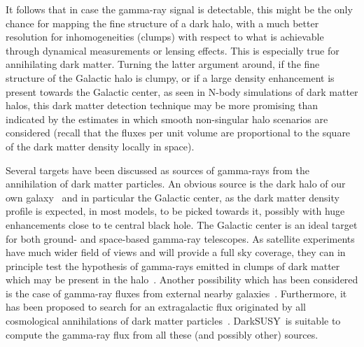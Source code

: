 \documentclass[a4paper,10pt,oneside]{book}
\newcommand{\ds}{{\sffamily DarkSUSY}}
\begin{document}
It follows that in case the gamma-ray signal is detectable, 
this might be the only chance for mapping the fine structure of a dark 
halo, with a much better resolution for inhomogeneities (clumps) with 
respect to what is achievable through dynamical measurements or lensing effects. 
This is especially true for annihilating dark matter. 
Turning the latter argument around, if the fine structure of the Galactic 
halo is clumpy, or if a large density enhancement is present towards the 
Galactic center, as seen in N-body simulations of dark matter halos,
this dark matter detection technique may be more promising than indicated 
by the estimates in which smooth non-singular halo 
scenarios are considered (recall that the fluxes per unit volume are 
proportional to the square of the dark matter density locally in space).


Several targets have been discussed as sources of gamma-rays from the
annihilation of dark matter particles. An obvious source is the dark
halo of our own galaxy~\cite{Turner:1986vr,Ipser:1987ru,Freese:1989tg,Berezinsky:1994wva} and in particular the Galactic center,
as the dark matter density profile is expected, in most models, to be 
picked towards it, possibly with huge enhancements close to te central 
black hole. The Galactic center is an ideal target for both ground-
and space-based gamma-ray telescopes. As satellite experiments have 
much wider field of views and will provide a full sky coverage,
they can in principle test the hypothesis of gamma-rays emitted in clumps of dark 
matter which may be present in the 
halo~\cite{Lake:1990du,Silk:1992bh,CalcaneoRoldan:2000yt,Bergstrom:1998zs,Bergstrom:1998jj,Bergstrom:2000bk}. 
Another possibility which has been considered is the case of 
gamma-ray fluxes from external nearby galaxies~\cite{Baltz:1999ra}. 
Furthermore, it has 
been proposed to search for an extragalactic flux originated by all 
cosmological annihilations of dark matter 
particles~\cite{Cline:1990mr,Gao:1991rz,Bergstrom:2001jj}.
\ds\ is suitable to compute the gamma-ray flux from all these (and possibly 
other) sources. 
\end{document}
